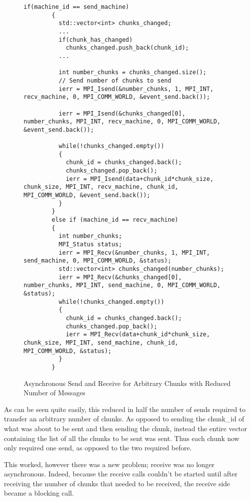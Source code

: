 \documentclass[thesis.tex]{subfiles}
\begin{document}
    \begin{figure}[htbp]
      \centering
      \lstset{language=cpp}  
      \begin{lstlisting}[tabsize=2]
        if(machine_id == send_machine)
        {
          std::vector<int> chunks_changed;
          ...
          if(chunk_has_changed)
            chunks_changed.push_back(chunk_id);
          ...

          int number_chunks = chunks_changed.size();
          // Send number of chunks to send
          ierr = MPI_Isend(&number_chunks, 1, MPI_INT, recv_machine, 0, MPI_COMM_WORLD, &event_send.back());

          ierr = MPI_Isend(&chunks_changed[0], number_chunks, MPI_INT, recv_machine, 0, MPI_COMM_WORLD, &event_send.back());

          while(!chunks_changed.empty())
          {
            chunk_id = chunks_changed.back();
            chunks_changed.pop_back();
            ierr = MPI_Isend(data+chunk_id*chunk_size, chunk_size, MPI_INT, recv_machine, chunk_id, MPI_COMM_WORLD, &event_send.back());
          }
        }
        else if (machine_id == recv_machine)
        {
          int number_chunks;
          MPI_Status status;
          ierr = MPI_Recv(&number_chunks, 1, MPI_INT, send_machine, 0, MPI_COMM_WORLD, &status);
          std::vector<int> chunks_changed(number_chunks);
          ierr = MPI_Recv(&chunks_changed[0], number_chunks, MPI_INT, send_machine, 0, MPI_COMM_WORLD, &status);
          while(!chunks_changed.empty())
          {
            chunk_id = chunks_changed.back();
            chunks_changed.pop_back();
            ierr = MPI_Recv(data+chunk_id*chunk_size, chunk_size, MPI_INT, send_machine, chunk_id, MPI_COMM_WORLD, &status);
          }       
        }
        \end{lstlisting}

      \caption{Asynchronous Send and Receive for Arbitrary Chunks with Reduced Number of Messages}
      \label{fig:final_send_receive}
    \end{figure}


    As can be seen quite easily, this reduced in half the number of sends required to transfer an arbitrary number of chunks. As opposed to sending the chunk\_id of what was about to be sent and then sending the chunk, instead the entire vector containing the list of all the chunks to be sent was sent. Thus each chunk now only required one send, as opposed to the two required before.

    This worked, however there was a new problem; receive was no longer asynchronous. Indeed, because the receive calls couldn't be started until after receiving the number of chunks that needed to be received, the receive side became a blocking call.
\end{document}
